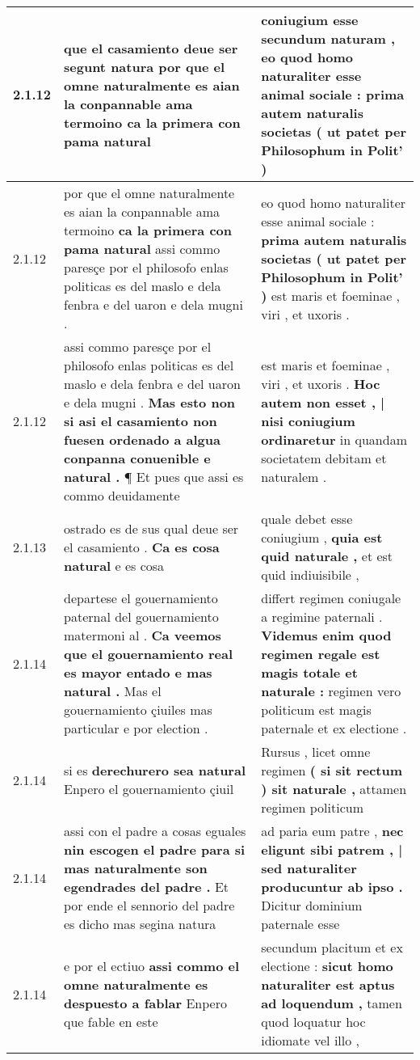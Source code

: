\begin{tabular}{|p{1cm}|p{6.5cm}|p{6.5cm}|}
2.1.12 & que el casamiento deue ser segunt natura \textbf{ por que el omne naturalmente es aian la conpannable ama termoino } ca la primera con pama natural & coniugium esse secundum naturam , \textbf{ eo quod homo naturaliter esse animal sociale : } prima autem naturalis societas ( ut patet per Philosophum in Polit’ ) \\\hline
2.1.12 & por que el omne naturalmente es aian la conpannable ama termoino \textbf{ ca la primera con pama natural } assi commo paresçe por el philosofo enlas politicas es del maslo e dela fenbra e del uaron e dela mugni . & eo quod homo naturaliter esse animal sociale : \textbf{ prima autem naturalis societas ( ut patet per Philosophum in Polit’ ) } est maris et foeminae , viri , et uxoris . \\\hline
2.1.12 & assi commo paresçe por el philosofo enlas politicas es del maslo e dela fenbra e del uaron e dela mugni . \textbf{ Mas esto non si asi el casamiento non fuesen ordenado a algua conpanna conuenible e natural . } ¶ Et pues que assi es commo deuidamente & est maris et foeminae , viri , et uxoris . \textbf{ Hoc autem non esset , | nisi coniugium ordinaretur } in quandam societatem debitam et naturalem . \\\hline
2.1.13 & ostrado es de sus qual deue ser el casamiento . \textbf{ Ca es cosa natural } e es cosa & quale debet esse coniugium , \textbf{ quia est quid naturale , } et est quid indiuisibile , \\\hline
2.1.14 & departese el gouernamiento paternal del gouernamiento matermoni al . \textbf{ Ca veemos que el gouernamiento real es mayor entado e mas natural . } Mas el gouernamiento çiuiles mas particular e por election . & differt regimen coniugale a regimine paternali . \textbf{ Videmus enim quod regimen regale est magis totale et naturale : } regimen vero politicum est magis paternale et ex electione . \\\hline
2.1.14 & si es \textbf{ derechurero sea natural } Enpero el gouernamiento çiuil & Rursus , licet omne regimen \textbf{ ( si sit rectum ) sit naturale , } attamen regimen politicum \\\hline
2.1.14 & assi con el padre a cosas eguales \textbf{ nin escogen el padre para si mas naturalmente son egendrades del padre . } Et por ende el sennorio del padre es dicho mas segina natura & ad paria eum patre , \textbf{ nec eligunt sibi patrem , | sed naturaliter producuntur ab ipso . } Dicitur dominium paternale esse \\\hline
2.1.14 & e por el ectiuo \textbf{ assi commo el omne naturalmente es despuesto a fablar } Enpero que fable en este & secundum placitum et ex electione : \textbf{ sicut homo naturaliter est aptus ad loquendum , } tamen quod loquatur hoc idiomate vel illo , \\\hline

\end{tabular}
